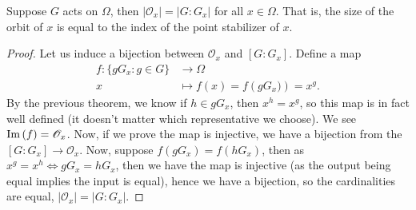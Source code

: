 \begin{theorem}
Suppose \(G\) acts on \(\Omega\), then \(\left| \mathscr{O}_{x} \right| = \left| G : G_{x} \right| \)	for all \(x \in \Omega\). That is, the size of the orbit of \(x\) is equal to the index of the point stabilizer of \(x\).
\end{theorem}
\begin{proof}
Let us induce a bijection between \(\mathscr{O}_{x}\)	 and \(\left[ G : G_{x} \right] \). Define a map \begin{align*}
	f: \{gG_{x} : g \in G\}  &\longrightarrow \Omega  \\
	x &\longmapsto f(x) = f\left( gG_x)  \right) = x^{g}
.\end{align*}
By the previous theorem, we know if \(h \in gG_{x}\), then \(x^{h}=x^{g}\), so this map is in fact well defined (it doesn't matter which representative we choose). We see \(\operatorname{Im} \left( f \right) = \mathscr{O}_{x}\). Now, if we prove the map is injective, we have a bijection from the \(\left[ G:G_{x} \right] \to \mathscr{O}_{x}\). Now, suppose \(f\left( gG_{x} \right) = f\left( hG_{x} \right)  \), then as \(x^{g} = x^{ h} \iff gG_{x} = hG_{x}\), then we have the map is injective (as the output being equal implies the input is equal), hence we have  a bijection, so the cardinalities are equal, \(\left| \mathscr{O}_{x} \right|  = \left| G : G_{x} \right| \).
\end{proof}
